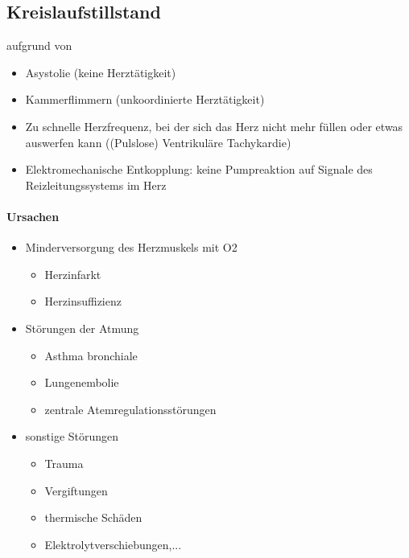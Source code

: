 \subsection{Kreislaufstillstand}\label{bkm:RefHeading42514602}

 aufgrund von

\begin{itemize}
    \item Asystolie (keine Herzt\"atigkeit)
    \item Kammerflimmern (unkoordinierte Herzt\"atigkeit)
    \item Zu schnelle Herzfrequenz, bei der sich das Herz
    nicht mehr füllen oder etwas auswerfen kann ((Pulslose) Ventrikul\"are Tachykardie)
    \item Elektromechanische Entkopplung: keine
    Pumpreaktion auf Signale des Reizleitungssystems im Herz
\end{itemize}


\paragraph{Ursachen}

\begin{itemize}
    \item Minderversorgung des Herzmuskels mit O2
    \begin{itemize}
        \item Herzinfarkt
        \item Herzinsuffizienz
    \end{itemize}
    \item St\"orungen der Atmung
    \begin{itemize}
        \item Asthma bronchiale
        \item Lungenembolie
        \item zentrale Atemregulationsst\"orungen
    \end{itemize}
    \item sonstige St\"orungen
    \begin{itemize}
        \item Trauma
        \item Vergiftungen
        \item thermische Sch\"aden
        \item Elektrolytverschiebungen,...
    \end{itemize}
\end{itemize}


